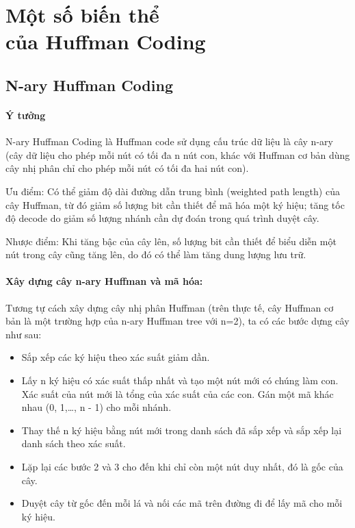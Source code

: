 \chapter[Một số biến thể của Huffman Coding]{Một số biến thể\\ của Huffman Coding}
\section{N-ary Huffman Coding}

\subsubsection{Ý tưởng}

 N-ary Huffman Coding là Huffman code sử dụng cấu trúc dữ liệu là cây n-ary (cây dữ liệu cho phép mỗi nút có tối đa n nút con, khác với Huffman cơ bản dùng cây nhị phân chỉ cho phép mỗi nút có tối đa hai nút con). 

Ưu điểm: Có thể giảm độ dài đường dẫn trung bình (weighted path length) của cây Huffman, từ đó giảm số lượng bit cần thiết để mã hóa một ký hiệu; tăng tốc độ decode do giảm số lượng nhánh cần dự đoán trong quá trình duyệt cây.

Nhược điểm: Khi tăng bậc của cây lên, số lượng bit cần thiết để biểu diễn một nút trong cây cũng tăng lên, do đó có thể làm tăng dung lượng lưu trữ.

\subsubsection{Xây dựng cây n-ary Huffman và mã hóa: }

Tương tự cách xây dựng cây nhị phân Huffman (trên thực tế, cây Huffman cơ bản là một trường hợp của n-ary Huffman tree với n=2), ta có các bước dựng cây như sau:
\begin{itemize}
    \item Sắp xếp các ký hiệu theo xác suất giảm dần.
    \item Lấy n ký hiệu có xác suất thấp nhất và tạo một nút mới có chúng làm con. Xác suất của nút mới là tổng của xác suất của các con. Gán một mã khác nhau (0, 1,…, n - 1) cho mỗi nhánh.
    \item Thay thế n ký hiệu bằng nút mới trong danh sách đã sắp xếp và sắp xếp lại danh sách theo xác suất.
    \item Lặp lại các bước 2 và 3 cho đến khi chỉ còn một nút duy nhất, đó là gốc của cây.
    \item Duyệt cây từ gốc đến mỗi lá và nối các mã trên đường đi để lấy mã cho mỗi ký hiệu.
\end{itemize}

